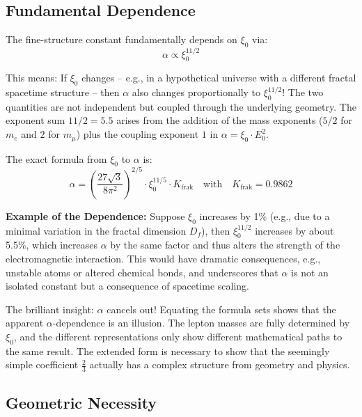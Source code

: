 \documentclass[12pt,a4paper]{article}
\newcommand{\xipar}{\xi_0}
\newcommand{\Ezero}{E_0}
\newcommand{\Dfrak}{D_f}
\begin{document}
	\subsection{Fundamental Dependence}
	
	The fine-structure constant fundamentally depends on $\xipar$ via:
	\begin{equation}
		\alpha \propto \xipar^{11/2}
		\label{eq:alpha_xi_dependence}
	\end{equation}
	
	This means: If $\xipar$ changes – e.g., in a hypothetical universe with a different fractal spacetime structure – then $\alpha$ also changes proportionally to $\xipar^{11/2}$! The two quantities are not independent but coupled through the underlying geometry. The exponent sum $11/2 = 5.5$ arises from the addition of the mass exponents ($5/2$ for $m_e$ and $2$ for $m_\mu$) plus the coupling exponent $1$ in $\alpha = \xipar \cdot \Ezero^2$.
	
	The exact formula from $\xipar$ to $\alpha$ is:
	\begin{equation}
		\boxed{\alpha = \left(\frac{27\sqrt{3}}{8\pi^2}\right)^{2/5} \cdot \xipar^{11/5} \cdot K_{\text{frak}}}
		\quad \text{with} \quad K_{\text{frak}} = 0.9862
	\end{equation}
	
	\textbf{Example of the Dependence:} Suppose $\xipar$ increases by 1\% (e.g., due to a minimal variation in the fractal dimension $\Dfrak$), then $\xipar^{11/2}$ increases by about 5.5\%, which increases $\alpha$ by the same factor and thus alters the strength of the electromagnetic interaction. This would have dramatic consequences, e.g., unstable atoms or altered chemical bonds, and underscores that $\alpha$ is not an isolated constant but a consequence of spacetime scaling.
	
	The brilliant insight: $\alpha$ cancels out! Equating the formula sets shows that the apparent $\alpha$-dependence is an illusion. The lepton masses are fully determined by $\xipar$, and the different representations only show different mathematical paths to the same result. The extended form is necessary to show that the seemingly simple coefficient $\frac{2}{3}$ actually has a complex structure from geometry and physics.
	
	\subsection{Geometric Necessity}
	
\end{document}
